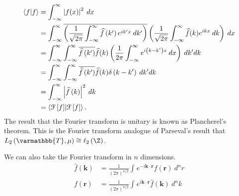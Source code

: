 \documentclass[10pt]{mypackage}
\renewcommand*{\mathbb}[1]{\varmathbb{#1}}
\begin{document}
\begin{align*}
  \braket{f}{f} &= \int_{-\infty}^{\infty} \left\vert f(x) \right\vert^2\:dx\\
                &= \int_{-\infty}^{\infty} \overline{\left(\frac{1}{\sqrt{2\pi}}\int_{-\infty}^{\infty} \widehat{f}\left(k'\right)e^{ik'x}\:dk'\right)} \left(\frac{1}{\sqrt{2\pi}}\int_{-\infty}^{\infty} \widehat{f}(k)e^{ikx}\:dk\right)\:dx\\
                &= \int_{-\infty}^{\infty}\int_{-\infty}^{\infty} \overline{\widehat{f}\left(k'\right)}\widehat{f}(k)\left(\frac{1}{2\pi}\int_{-\infty}^{\infty}e^{i\left(k-k'\right)x}\:dx\right)\:dk' dk\\
                &= \int_{-\infty}^{\infty}\int_{-\infty}^{\infty} \overline{\widehat{f}\left(k'\right)}\widehat{f}(k)\delta\left(k-k'\right)\:dk' dk\\
                &= \int_{-\infty}^{\infty} \left\vert \widehat{f}\left(k\right) \right\vert^2\:dk\\
                &= \braket{\mathcal{F}\left[f\right]}{\mathcal{F}\left[f\right]}.
\end{align*}
The result that the Fourier transform is unitary is known as Plancherel's theorem. This is the Fourier transform analogue of Parseval's result that $L_{2}\left(\mathbb{T},\mu\right)\cong \ell_2\left(\Z\right)$.\newline

We can also take the Fourier transform in $n$ dimensions.
\begin{align*}
  \widehat{f}\left(\mathbf{k}\right) &= \frac{1}{\left(2\pi\right)^{n/2}}\int_{}^{} e^{-i\mathbf{k}\cdot \mathbf{r}}f\left(\mathbf{r}\right)\:d^n r\\
  f\left(\mathbf{r}\right) &= \frac{1}{\left(2\pi\right)^{n/2}}\int_{}^{} e^{i\mathbf{k}\cdot \mathbf{r}}\widehat{f}\left(\mathbf{k}\right)\:d^n k
\end{align*}
\end{document}
